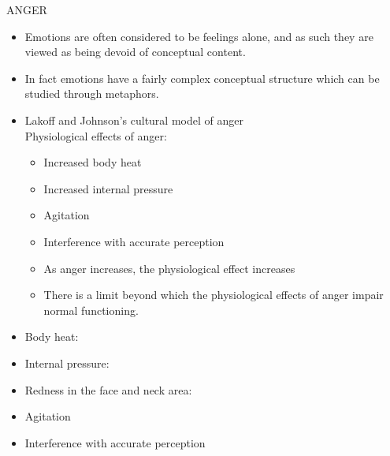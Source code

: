 \begin{frame}[allowframebreaks]{ANGER}

\begin{itemize}
\item Emotions are often considered to be feelings alone, and
as such they are viewed as being devoid of conceptual
content.
\item In fact emotions have a fairly complex conceptual
structure which can be studied through metaphors.
\item Lakoff and Johnson's cultural model of anger
\\ Physiological effects of anger:
  \begin{itemize}
  \item Increased body heat
  \item Increased internal pressure
  \item Agitation
  \item Interference with accurate perception
  \item As anger increases, the physiological effect increases
  \item There is a limit beyond which the physiological effects of anger impair normal functioning.
\end{itemize}
\end{itemize}
\framebreak
\begin{itemize}
\item Body heat:
  \begin{exe}
    \ex {}
    \ex {}
    \ex {}
    \ex {}
  \end{exe}
  \item Internal pressure:
  \begin{exe}
    \ex {}
    \ex {}
    \ex {}
  \end{exe}
\framebreak
\item Redness in the face and neck area:
  \begin{exe}
    \ex {}
    \ex {}
    \ex {}
  \end{exe}
\item Agitation
\begin{exe}
  \ex {}
  \ex {}
  \ex {}
  \ex {}
 \ex {}
\end{exe}
\framebreak
\item Interference with accurate perception
\begin{exe}
  \ex {}
  \ex {}
  \ex {}
\end{exe}
\end{itemize}

\end{frame}

